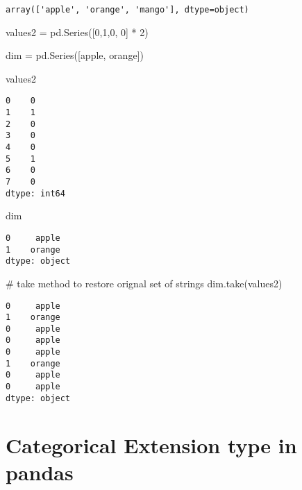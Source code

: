 \documentclass[
  letterpaper,
  DIV=11,
  numbers=noendperiod]{scrreprt}
\newenvironment{Shaded}{\begin{snugshade}}{\end{snugshade}}
\newcommand{\CommentTok}[1]{\textcolor[rgb]{0.37,0.37,0.37}{#1}}
\newcommand{\DecValTok}[1]{\textcolor[rgb]{0.68,0.00,0.00}{#1}}
\newcommand{\NormalTok}[1]{\textcolor[rgb]{0.00,0.23,0.31}{#1}}
\newcommand{\OperatorTok}[1]{\textcolor[rgb]{0.37,0.37,0.37}{#1}}
\newcommand{\StringTok}[1]{\textcolor[rgb]{0.13,0.47,0.30}{#1}}
\begin{document}
\begin{verbatim}
array(['apple', 'orange', 'mango'], dtype=object)
\end{verbatim}

\begin{Shaded}
\begin{Highlighting}[]
\NormalTok{values2 }\OperatorTok{=}\NormalTok{ pd.Series([}\DecValTok{0}\NormalTok{,}\DecValTok{1}\NormalTok{,}\DecValTok{0}\NormalTok{, }\DecValTok{0}\NormalTok{] }\OperatorTok{*} \DecValTok{2}\NormalTok{)}

\NormalTok{dim }\OperatorTok{=}\NormalTok{ pd.Series([}\StringTok{\textquotesingle{}apple\textquotesingle{}}\NormalTok{, }\StringTok{\textquotesingle{}orange\textquotesingle{}}\NormalTok{])}
\end{Highlighting}
\end{Shaded}

\begin{Shaded}
\begin{Highlighting}[]
\NormalTok{values2}
\end{Highlighting}
\end{Shaded}

\begin{verbatim}
0    0
1    1
2    0
3    0
4    0
5    1
6    0
7    0
dtype: int64
\end{verbatim}

\begin{Shaded}
\begin{Highlighting}[]
\NormalTok{dim}
\end{Highlighting}
\end{Shaded}

\begin{verbatim}
0     apple
1    orange
dtype: object
\end{verbatim}

\begin{Shaded}
\begin{Highlighting}[]
\CommentTok{\# take method to restore orignal set of strings}
\NormalTok{dim.take(values2)}
\end{Highlighting}
\end{Shaded}

\begin{verbatim}
0     apple
1    orange
0     apple
0     apple
0     apple
1    orange
0     apple
0     apple
dtype: object
\end{verbatim}

\hypertarget{categorical-extension-type-in-pandas}{%
\section{Categorical Extension type in
pandas}\label{categorical-extension-type-in-pandas}}
\end{document}
